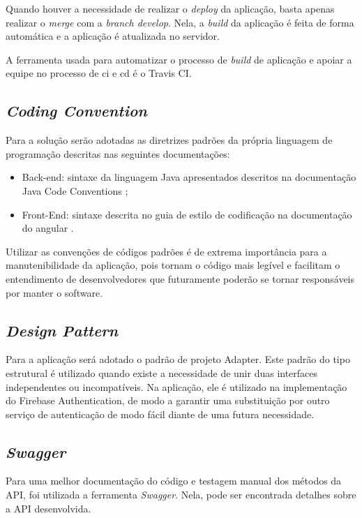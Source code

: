 Quando houver a necessidade de realizar o \textit{\gls{deploy}} da aplicação, basta apenas realizar o \textit{merge} com a \textit{branch develop}. Nela, a \textit{\gls{build}} da aplicação é feita de forma automática e a aplicação é atualizada no servidor. 


A ferramenta usada para automatizar o processo de \textit{\gls{build}} de aplicação e apoiar a equipe no processo de \ac{ci} e \ac{cd} é o Travis CI.


\subsection{\textit{Coding Convention}}
Para a solução serão adotadas as diretrizes padrões da própria linguagem de programação descritas nas seguintes documentações:

\begin{itemize}
\item Back-end: sintaxe da linguagem Java  apresentados descritos na documentação Java Code Conventions \cite{javacodeconvention:1997};
\item Front-End: sintaxe descrita no guia de estilo de codificação na documentação do angular \cite{angularstyleguide:2021}.
\end{itemize}


Utilizar as convenções de códigos padrões é de extrema importância para a manutenibilidade da aplicação, pois tornam o código mais legível e facilitam o entendimento de desenvolvedores que futuramente poderão se tornar responsáveis por manter o software.



\subsection{\textit{Design Pattern}}
Para a aplicação será adotado o padrão de projeto Adapter. Este padrão do tipo estrutural é utilizado quando existe a necessidade de unir duas interfaces independentes ou incompatíveis. Na aplicação, ele é utilizado na implementação do Firebase Authentication, de modo a garantir uma substituição por outro serviço de autenticação de modo fácil diante de uma futura necessidade.

\subsection{\textit{Swagger}}
Para uma melhor documentação do código e testagem manual dos métodos da API, foi utilizada a ferramenta \textit{Swagger}. Nela, pode ser encontrada detalhes sobre a API desenvolvida.


